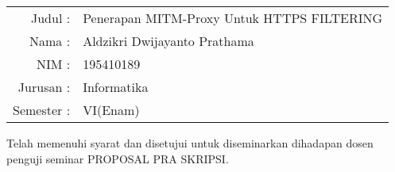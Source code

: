 \documentclass[../PROPOSAL_PRA_SKRIPSI_ALDZIKRI_DWIJAYANTO_PRATHAMA.tex]{subfiles}
\begin{document}
\section*{}
\vspace{5ex}
\begin{tabular}{rl}
  Judul    :& Penerapan MITM-Proxy Untuk HTTPS FILTERING\\[5ex]
  Nama     :& Aldzikri Dwijayanto Prathama\\[5ex]
  NIM      :& 195410189\\[5ex]
  Jurusan  :& Informatika\\[5ex]
  Semester :& VI(Enam)\\[5ex]
\end{tabular}
\begin{center}
  Telah memenuhi syarat dan disetujui untuk diseminarkan
  dihadapan dosen penguji seminar PROPOSAL PRA SKRIPSI.
\end{center}
\end{document}
